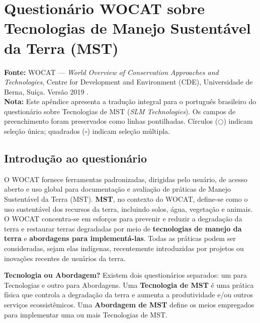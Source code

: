 
\chapter{Questionário WOCAT sobre Tecnologias de Manejo Sustentável da Terra (MST)}
\label{app:wocat}

\noindent\textbf{Fonte:} WOCAT --- \textit{World Overview of Conservation Approaches and Technologies}, Centre for Development and Environment (CDE), Universidade de Berna, Suíça. Versão 2019 \cite{Liniger2019}.\\[6pt]
\noindent\textbf{Nota:} Este apêndice apresenta a tradução integral para o português brasileiro do questionário sobre Tecnologias de MST (\textit{SLM Technologies}). Os campos de preenchimento foram preservados como linhas pontilhadas. Círculos ($\bigcirc$) indicam seleção única; quadrados ($\square$) indicam seleção múltipla.

\section{Introdução ao questionário}

O WOCAT fornece ferramentas padronizadas, dirigidas pelo usuário, de acesso aberto e uso global para documentação e avaliação de práticas de Manejo Sustentável da Terra (MST). \textbf{MST}, no contexto do WOCAT, define-se como o uso sustentável dos recursos da terra, incluindo solos, água, vegetação e animais. O WOCAT concentra-se em esforços para prevenir e reduzir a degradação da terra e restaurar terras degradadas por meio de \textbf{tecnologias de manejo da terra} e \textbf{abordagens para implementá-las}. Todas as práticas podem ser consideradas, sejam elas indígenas, recentemente introduzidas por projetos ou inovações recentes de usuários da terra.

\medskip\noindent
\textbf{Tecnologia ou Abordagem?} Existem dois questionários separados: um para Tecnologias e outro para Abordagens. Uma \textbf{Tecnologia de MST} é uma prática física que controla a degradação da terra e aumenta a produtividade e/ou outros serviços ecossistêmicos. Uma \textbf{Abordagem de MST} define os meios empregados para implementar uma ou mais Tecnologias de MST.

